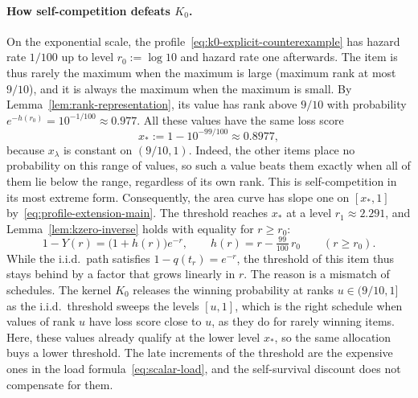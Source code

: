 \documentclass[11pt]{article}
\theoremstyle{definition}
\theoremstyle{remark}
\begin{document}
\paragraph{How self-competition defeats $K_0$.}
On the exponential scale, the profile~\eqref{eq:k0-explicit-counterexample} has hazard rate $1/100$ up to level $r_0:=\log10$ and hazard rate one afterwards.
The item is thus rarely the maximum when the maximum is large (maximum rank at most $9/10$), and it is always the maximum when the maximum is small.
By Lemma~\ref{lem:rank-representation}, its value has rank above $9/10$ with probability $e^{-h(r_0)}=10^{-1/100}\approx0.977$.
All these values have the same loss score
\[
 x_*:=1-10^{-99/100}\approx0.8977,
\]
because $x_\lambda$ is constant on $(9/10,1)$.
Indeed, the other items place no probability on this range of values, so such a value beats them exactly when all of them lie below the range, regardless of its own rank.
This is self-competition in its most extreme form.
Consequently, the area curve has slope one on $[x_*,1]$ by~\eqref{eq:profile-extension-main}.
The threshold reaches $x_*$ at a level $r_1\approx2.291$, and Lemma~\ref{lem:kzero-inverse} holds with equality for $r\ge r_0$:
\[
 1-Y(r)=\bigl(1+h(r)\bigr)e^{-r},
 \qquad
 h(r)=r-\tfrac{99}{100}\,r_0
 \qquad(r\ge r_0).
\]
While the i.i.d.\ path satisfies $1-q(t_r)=e^{-r}$, the threshold of this item thus stays behind by a factor that grows linearly in $r$.
The reason is a mismatch of schedules.
The kernel $K_0$ releases the winning probability at ranks $u\in(9/10,1]$ as the i.i.d.\ threshold sweeps the levels $[u,1]$, which is the right schedule when values of rank $u$ have loss score close to $u$, as they do for rarely winning items.
Here, these values already qualify at the lower level $x_*$, so the same allocation buys a lower threshold.
The late increments of the threshold are the expensive ones in the
load formula~\eqref{eq:scalar-load}, and the self-survival discount
does not compensate for them.
\end{document}
